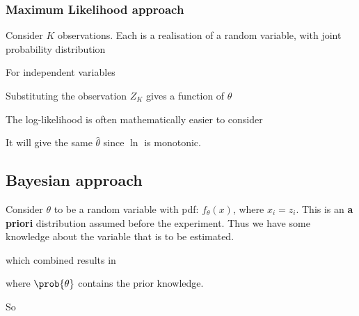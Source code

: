 \documentclass[10pt,a4paper]{scrartcl}
\begin{document}
\begin{multicols*}{2}
\subsubsection{Maximum Likelihood approach}

Consider $K$ observations. Each is a realisation of a random variable, with joint probability distribution


For independent variables


Substituting the observation $Z_K$ gives a function of $\theta$



The log-likelihood is often mathematically easier to consider


It will give the same $\hat{\theta}$ since $\ln$ is monotonic.

\subsection{Bayesian approach}

Consider $\theta$ to be a random variable with pdf: $f_\theta(x)$, where $x_i = z_i$. This is an \textbf{a priori} distribution assumed before the experiment. Thus we have some knowledge about the variable that is to be estimated.



which combined results in


where $\prob{\theta}$ contains the prior knowledge.

So


\end{multicols*}
\end{document}
